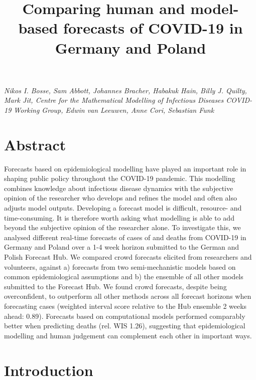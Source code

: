 \documentclass[
]{article}
\title{Comparing human and model-based forecasts of COVID-19 in Germany and Poland}
\author{}
\date{\vspace{-2.5em}}
\begin{document}
\maketitle

\emph{Nikos I. Bosse, Sam Abbott, Johannes Bracher, Habakuk Hain, Billy J. Quilty, Mark Jit, Centre for the Mathematical Modelling of Infectious Diseases COVID-19 Working Group, Edwin van Leeuwen, Anne Cori, Sebastian Funk}

\hypertarget{abstract}{%
\section{Abstract}\label{abstract}}

Forecasts based on epidemiological modelling have played an important role in shaping public policy throughout the COVID-19 pandemic. This modelling combines knowledge about infectious disease dynamics with the subjective opinion of the researcher who develops and refines the model and often also adjusts model outputs. Developing a forecast model is difficult, resource- and time-consuming. It is therefore worth asking what modelling is able to add beyond the subjective opinion of the researcher alone. To investigate this, we analysed different real-time forecasts of cases of and deaths from COVID-19 in Germany and Poland over a 1-4 week horizon submitted to the German and Polish Forecast Hub. We compared crowd forecasts elicited from researchers and volunteers, against a) forecasts from two semi-mechanistic models based on common epidemiological assumptions and b) the ensemble of all other models submitted to the Forecast Hub. We found crowd forecasts, despite being overconfident, to outperform all other methods across all forecast horizons when forecasting cases (weighted interval score relative to the Hub ensemble 2 weeks ahead: 0.89). Forecasts based on computational models performed comparably better when predicting deaths (rel. WIS 1.26), suggesting that epidemiological modelling and human judgement can complement each other in important ways.

\hypertarget{introduction}{%
\section{Introduction}\label{introduction}}
\end{document}

